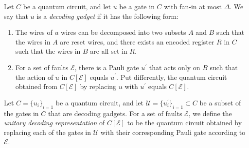 \begin{definition}
  Let $C$ be a quantum circuit, and let $u$ be a gate in $C$ with fan-in at most $\Delta$. We say that $u$ is a \textit{decoding gadget} if it has the following form:
  \begin{enumerate}
    \item The wires of $u$ wires can be decomposed into two subsets $A$ and $B$ such that the wires in $A$ are reset wires, and there exists an encoded register $R$ in $C$ such that the wires in $B$ are all set in $R$.
    \item For a set of faults $\mathcal{E}$, there is a Pauli gate $u^\prime$ that acts only on $B$ such that the action of $u$ in $C[\mathcal{E}]$ equals $u^{\prime}$. Put differently, the quantum circuit obtained from $C[\mathcal{E}]$ by replacing $u$ with $u^{\prime}$ equals $C[\mathcal{E}]$.
  \end{enumerate}
\end{definition}


\begin{definition}
  Let $C = \{u_{i}\}_{i=1}$ be a quantum circuit, and let $\mathcal{U} = \{u^{\prime}_{i}\}_{i=1} \subset C$ be a subset of the gates in $C$ that are decoding gadgets. For a set of faults $\mathcal{E}$, we define the \textit{unitary decoding representation} of $C[\mathcal{E}]$ to be the quantum circuit obtained by replacing each of the gates in $\mathcal{U}$ with their corresponding Pauli gate according to $\mathcal{E}$.
\end{definition}






